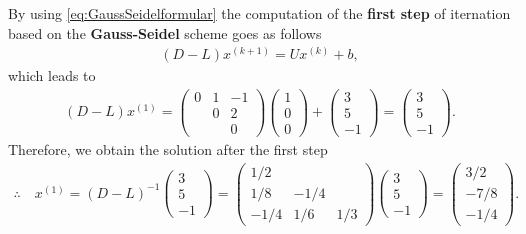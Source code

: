 \documentclass[12pt]{article}
\begin{document}
By using \eqref{eq:GaussSeidelformular}
the computation of the \textbf{first step} of iternation based on 
the \textbf{Gauss-Seidel} scheme goes as follows
\begin{align}
	(D-L) x^{(k+1)} = U x^{(k)} + b,
\end{align}
which leads to
\begin{align}
	(D-L) x^{(1)}=
	\begin{pmatrix} 0&1&-1\\&0&2\\&&0\end{pmatrix}
	\begin{pmatrix} 1\\0\\0\end{pmatrix}
	+ \begin{pmatrix}3\\5\\-1\end{pmatrix}
	=\begin{pmatrix}3\\5\\-1\end{pmatrix}.
\end{align}
Therefore, we obtain the solution after the first step
\begin{align}
	\therefore\quad\boxed{
		x^{(1)}=(D-L)^{-1}
		\begin{pmatrix}3\\5\\-1\end{pmatrix}
		= \begin{pmatrix}1/2&&\\1/8&-1/4&\\-1/4&1/6&1/3\end{pmatrix}
		\begin{pmatrix} 3\\5\\-1\end{pmatrix}
		= \begin{pmatrix} 3/2\\-7/8\\-1/4\end{pmatrix}.
	}
\end{align}
\newpage
\end{document}
